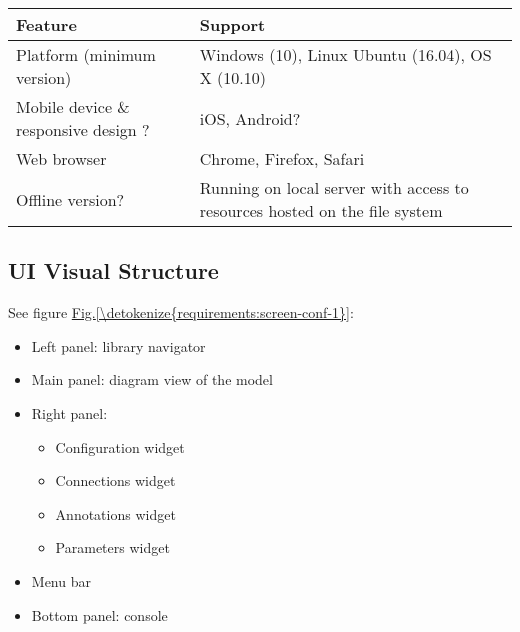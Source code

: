 \documentclass[letterpaper,10pt, openany,english]{sphinxmanual}
\begin{document}
\begin{savenotes}\sphinxattablestart
\centering
{}
\sphinxthecaptionisattop
{}\label{\detokenize{requirements:id13}}\label{\detokenize{requirements:tab-environment}}
\sphinxaftertopcaption
\begin{tabulary}{\linewidth}[t]{|T|T|}
\hline
\sphinxstyletheadfamily 
Feature
&\sphinxstyletheadfamily 
Support
\\
\hline
Platform (minimum version)
&
Windows (10), Linux Ubuntu (16.04), OS X (10.10)
\\
\hline
Mobile device \& responsive design ?
&
iOS, Android?
\\
\hline
Web browser
&
Chrome, Firefox, Safari
\\
\hline
Offline version?
&
Running on local server with access to resources hosted on the file system
\\
\hline
\end{tabulary}
\par
\sphinxattableend\end{savenotes}


\subsection{UI Visual Structure}
\label{\detokenize{requirements:ui-visual-structure}}
See figure \hyperref[\detokenize{requirements:screen-conf-1}]{Fig.\@ \ref{\detokenize{requirements:screen-conf-1}}}:
\begin{itemize}
\item {} 
Left panel: library navigator

\item {} 
Main panel: diagram view of the model

\item {} 
Right panel:
\begin{itemize}
\item {} 
Configuration widget

\item {} 
Connections widget

\item {} 
Annotations widget

\item {} 
Parameters widget

\end{itemize}

\item {} 
Menu bar

\item {} 
Bottom panel: console

\end{itemize}
\end{document}
